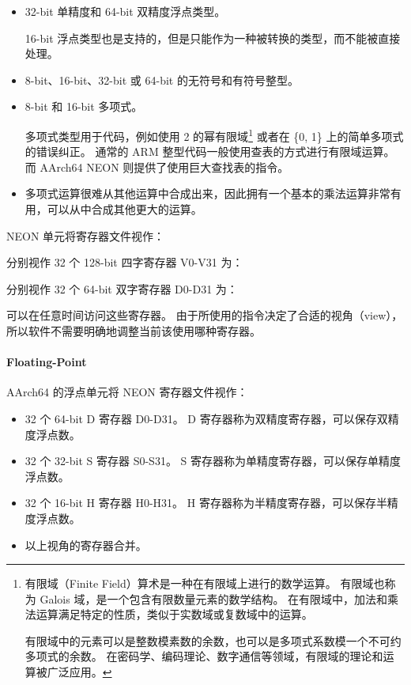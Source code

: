 \begin{itemize}
  \item 32-bit 单精度和 64-bit 双精度浮点类型。
    \begin{Tcbox}[title={Note}]
      16-bit 浮点类型也是支持的，但是只能作为一种被转换的类型，而不能被直接处理。
    \end{Tcbox}
  \item 8-bit、16-bit、32-bit 或 64-bit 的无符号和有符号整型。
  \item 8-bit 和 16-bit 多项式。

    多项式类型用于代码，例如使用 2 的幂有限域\footnote{
      有限域（Finite Field）算术是一种在有限域上进行的数学运算。
      有限域也称为 Galois 域，是一个包含有限数量元素的数学结构。
      在有限域中，加法和乘法运算满足特定的性质，类似于实数域或复数域中的运算。

      有限域中的元素可以是整数模素数的余数，也可以是多项式系数模一个不可约多项式的余数。
      在密码学、编码理论、数字通信等领域，有限域的理论和运算被广泛应用。
    }
    或者在 \{0, 1\} 上的简单多项式的错误纠正。
    通常的 ARM 整型代码一般使用查表的方式进行有限域运算。
    而 AArch64 NEON 则提供了使用巨大查找表的指令。

  \item 多项式运算很难从其他运算中合成出来，因此拥有一个基本的乘法运算非常有用，可以从中合成其他更大的运算。
\end{itemize}

NEON 单元将寄存器文件视作：

分别视作 32 个 128-bit 四字寄存器 V0-V31 为：


分别视作 32 个 64-bit 双字寄存器 D0-D31 为：


可以在任意时间访问这些寄存器。
由于所使用的指令决定了合适的视角（view），所以软件不需要明确地调整当前该使用哪种寄存器。

\paragraph{Floating-Point}

AArch64 的浮点单元将 NEON 寄存器文件视作：

\begin{itemize}
  \item 32 个 64-bit D 寄存器 D0-D31。
    D 寄存器称为双精度寄存器，可以保存双精度浮点数。
  \item 32 个 32-bit S 寄存器 S0-S31。
    S 寄存器称为单精度寄存器，可以保存单精度浮点数。
  \item 32 个 16-bit H 寄存器 H0-H31。
    H 寄存器称为半精度寄存器，可以保存半精度浮点数。
  \item 以上视角的寄存器合并。
\end{itemize}

